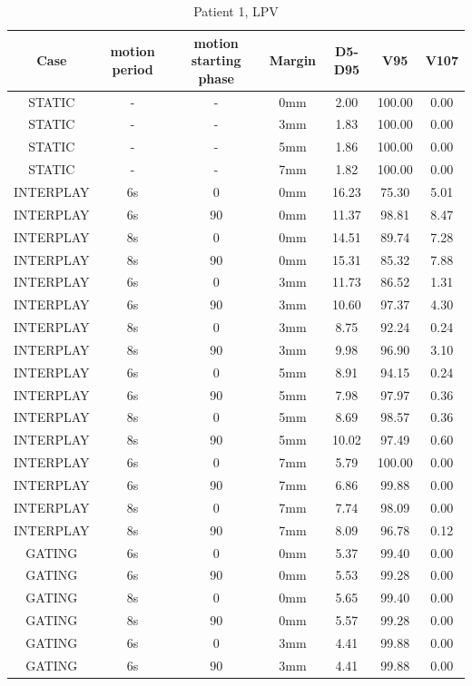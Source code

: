 \documentclass[type=dr, dr=rernat, accentcolor=tud7b,colorbacktitle, bigchapter, openright, twoside, 12pt ]{tudthesis}
\begin{document}
\begin{table}[H]
  \centering
  \caption{Patient 1, LPV}
  \begin{tabular}{|c||c|c|c||c|c|c|}
    \hline\hline
    Case & motion period & motion starting phase & Margin & D5-D95 & V95 & V107\\
    \hline 
STATIC & - & - & 0mm & 2.00 & 100.00 & 0.00 \\
STATIC & - & - & 3mm & 1.83 & 100.00 & 0.00 \\
STATIC & - & - & 5mm & 1.86 & 100.00 & 0.00 \\
STATIC & - & - & 7mm & 1.82 & 100.00 & 0.00 \\
INTERPLAY & 6s & 0 & 0mm & 16.23 & 75.30 & 5.01 \\
INTERPLAY & 6s & 90 & 0mm & 11.37 & 98.81 & 8.47 \\
INTERPLAY & 8s & 0 & 0mm & 14.51 & 89.74 & 7.28 \\
INTERPLAY & 8s & 90 & 0mm & 15.31 & 85.32 & 7.88 \\
INTERPLAY & 6s & 0 & 3mm & 11.73 & 86.52 & 1.31 \\
INTERPLAY & 6s & 90 & 3mm & 10.60 & 97.37 & 4.30 \\
INTERPLAY & 8s & 0 & 3mm & 8.75 & 92.24 & 0.24 \\
INTERPLAY & 8s & 90 & 3mm & 9.98 & 96.90 & 3.10 \\
INTERPLAY & 6s & 0 & 5mm & 8.91 & 94.15 & 0.24 \\
INTERPLAY & 6s & 90 & 5mm & 7.98 & 97.97 & 0.36 \\
INTERPLAY & 8s & 0 & 5mm & 8.69 & 98.57 & 0.36 \\
INTERPLAY & 8s & 90 & 5mm & 10.02 & 97.49 & 0.60 \\
INTERPLAY & 6s & 0 & 7mm & 5.79 & 100.00 & 0.00 \\
INTERPLAY & 6s & 90 & 7mm & 6.86 & 99.88 & 0.00 \\
INTERPLAY & 8s & 0 & 7mm & 7.74 & 98.09 & 0.00 \\
INTERPLAY & 8s & 90 & 7mm & 8.09 & 96.78 & 0.12 \\
GATING & 6s & 0 & 0mm & 5.37 & 99.40 & 0.00 \\
GATING & 6s & 90 & 0mm & 5.53 & 99.28 & 0.00 \\
GATING & 8s & 0 & 0mm & 5.65 & 99.40 & 0.00 \\
GATING & 8s & 90 & 0mm & 5.57 & 99.28 & 0.00 \\
GATING & 6s & 0 & 3mm & 4.41 & 99.88 & 0.00 \\
GATING & 6s & 90 & 3mm & 4.41 & 99.88 & 0.00 \\

\end{tabular}
\end{table}
\end{document}
